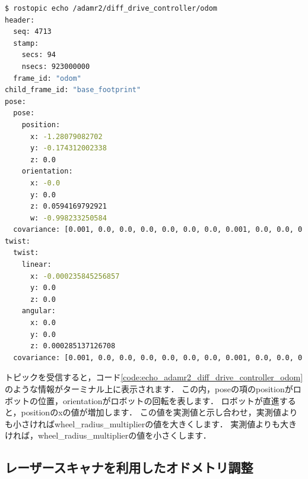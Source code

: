 \documentclass[{../../master}]{subfiles}
\begin{document}
\begin{lstlisting}[language=sh, label=code:echo_adamr2_diff_drive_controller_odom, caption=Show Odometry Topic Message]
$ rostopic echo /adamr2/diff_drive_controller/odom
header: 
  seq: 4713
  stamp: 
    secs: 94
    nsecs: 923000000
  frame_id: "odom"
child_frame_id: "base_footprint"
pose: 
  pose: 
    position: 
      x: -1.28079082702
      y: -0.174312002338
      z: 0.0
    orientation: 
      x: -0.0
      y: 0.0
      z: 0.0594169792921
      w: -0.998233250584
  covariance: [0.001, 0.0, 0.0, 0.0, 0.0, 0.0, 0.0, 0.001, 0.0, 0.0, 0.0, 0.0, 0.0, 0.0, 1000000.0, 0.0, 0.0, 0.0, 0.0, 0.0, 0.0, 1000000.0, 0.0, 0.0, 0.0, 0.0, 0.0, 0.0, 1000000.0, 0.0, 0.0, 0.0, 0.0, 0.0, 0.0, 10.0]
twist: 
  twist: 
    linear: 
      x: -0.000235845256857
      y: 0.0
      z: 0.0
    angular: 
      x: 0.0
      y: 0.0
      z: 0.000285137126708
  covariance: [0.001, 0.0, 0.0, 0.0, 0.0, 0.0, 0.0, 0.001, 0.0, 0.0, 0.0, 0.0, 0.0, 0.0, 1000000.0, 0.0, 0.0, 0.0, 0.0, 0.0, 0.0, 1000000.0, 0.0, 0.0, 0.0, 0.0, 0.0, 0.0, 1000000.0, 0.0, 0.0, 0.0, 0.0, 0.0, 0.0, 10.0]
\end{lstlisting}

トピックを受信すると，コード\ref{code:echo_adamr2_diff_drive_controller_odom}のような情報がターミナル上に表示されます．
この内，\textsf{pose}の項の\textsf{position}がロボットの位置，\textsf{orientation}がロボットの回転を表します．
ロボットが直進すると，\textsf{position}の\textsf{x}の値が増加します．
この値を実測値と示し合わせ，実測値よりも小さければ\textsf{wheel\_radius\_multiplier}の値を大きくします．
実測値よりも大きければ，\textsf{wheel\_radius\_multiplier}の値を小さくします．

\subsection{レーザースキャナを利用したオドメトリ調整}
\end{document}
